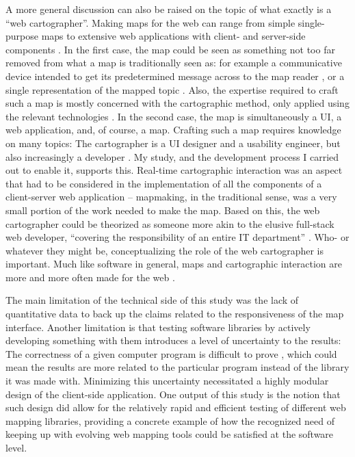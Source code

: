 A more general discussion can also be raised on the topic of what exactly is
a \enquote{web cartographer}.
Making maps for the web can range from simple
single-purpose maps to extensive web applications with
client- and server-side components \parencite{vee2017, mai2017}.
In the first case,
the map could be seen as something not too far removed from
what a map is traditionally seen as: for example a communicative
device intended to get its predetermined message across to the map reader
\parencite{kol1969},
or a single representation of the mapped topic \parencite{tyn1992}.
Also, the expertise required to craft such a map is mostly concerned with
the cartographic method, only applied using the relevant technologies \parencite{rot2021}.
In the second case,
the map is simultaneously a UI, a web application, and, of course, a map.
Crafting such a map requires knowledge on many topics:
The cartographer is a UI designer and a usability engineer,
but also increasingly a developer \parencite{rot2017, mai2017}.
My study, and the development process I carried out to enable it, supports this.
Real-time cartographic interaction was an aspect that had to be considered
in the implementation of all the components of a client-server web application --
mapmaking, in the traditional sense, was a very small portion of the work
needed to make the map.
Based on this,
the web cartographer could be theorized as
someone more akin to the elusive full-stack web developer,
\enquote{covering the responsibility of an entire IT
department} \parencite[p.~370]{tai2021}.
Who- or whatever they might be, conceptualizing the role of the web cartographer is important.
Much like software in general, maps and cartographic interaction
are more and more often made for the web \parencite{tai2017, rot2021, vee2017}.

The main limitation of the technical side of this study
was the lack of quantitative data to back up
the claims related to the responsiveness of the map interface.
Another limitation is that testing software libraries by
actively developing something with them introduces
a level of uncertainty to the results:
The correctness of a given computer program is difficult to prove
\parencite{dij1970, amm2016},
which could mean the results are more related to the particular program
instead of the library it was made with.
Minimizing this uncertainty necessitated
a highly modular design of the client-side application.
One output of this study is the notion that such design did allow for
the relatively rapid and efficient testing of different web mapping libraries,
providing a concrete example of
how the recognized need of keeping up with evolving web mapping tools \parencite{rot2014, rot2021}
could be satisfied at the software level.


